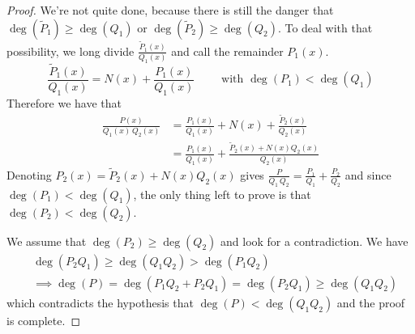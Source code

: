 \begin{proof}
We're not quite done, because there is still the danger that
$\deg(\tilde P_1)\ge \deg(Q_1)$  or $\deg(\tilde P_2)\ge \deg(Q_2)$.
To deal with that possibility, we long divide $\frac{\tilde P_1(x)}{Q_1(x)}$ 
and call the remainder $P_1(x)$.
\begin{equation*}
\frac{\tilde P_1(x)}{Q_1(x)}=N(x)+\frac{P_1(x)}{Q_1(x)}
                  \qquad\text{ with }\deg(P_1)<\deg(Q_1)
\end{equation*}
Therefore we have that
\begin{align*}
\frac{P(x)}{Q_1(x)\,Q_2(x)}
&=\frac{P_1(x)}{Q_1(x)} +N(x) +\frac{\tilde P_2(x)}{Q_2(x)} \\
&=\frac{P_1(x)}{Q_1(x)} +\frac{\tilde P_2(x)+N(x)Q_2(x)}{Q_2(x)}
\end{align*}
Denoting $P_2(x)=\tilde P_2(x)+N(x)Q_2(x)$ gives
$
\frac{P}{Q_1\,Q_2}
=\frac{P_1}{Q_1} +\frac{P_2}{Q_2}
$
and since $\deg(P_1)<\deg(Q_1)$, the only thing left to prove is that $\deg(P_2)<\deg(Q_2)$. 

We assume that $\deg(P_2)\ge\deg(Q_2)$ and look for a contradiction.
We have 
\begin{align*}
&\deg(P_2Q_1)\ge\deg(Q_1Q_2)>\deg(P_1Q_2) \\
&\implies \deg(P)=\deg(P_1Q_2+P_2Q_1)=\deg(P_2Q_1)\ge\deg(Q_1Q_2)
\end{align*}
which contradicts the hypothesis that $\deg(P)<\deg(Q_1Q_2)$ and the proof is 
complete.
\end{proof}

